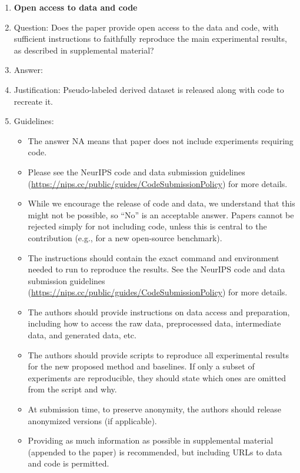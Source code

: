 \documentclass{article}
\begin{document}
\begin{enumerate}
\item {\bf Open access to data and code}
    \item[] Question: Does the paper provide open access to the data and code, with sufficient instructions to faithfully reproduce the main experimental results, as described in supplemental material?
    \item[] Answer: \answerYes{} %
    \item[] Justification: Pseudo-labeled derived dataset is released along with code to recreate it. 
    \item[] Guidelines:
    \begin{itemize}
        \item The answer NA means that paper does not include experiments requiring code.
        \item Please see the NeurIPS code and data submission guidelines (\url{https://nips.cc/public/guides/CodeSubmissionPolicy}) for more details.
        \item While we encourage the release of code and data, we understand that this might not be possible, so “No” is an acceptable answer. Papers cannot be rejected simply for not including code, unless this is central to the contribution (e.g., for a new open-source benchmark).
        \item The instructions should contain the exact command and environment needed to run to reproduce the results. See the NeurIPS code and data submission guidelines (\url{https://nips.cc/public/guides/CodeSubmissionPolicy}) for more details.
        \item The authors should provide instructions on data access and preparation, including how to access the raw data, preprocessed data, intermediate data, and generated data, etc.
        \item The authors should provide scripts to reproduce all experimental results for the new proposed method and baselines. If only a subset of experiments are reproducible, they should state which ones are omitted from the script and why.
        \item At submission time, to preserve anonymity, the authors should release anonymized versions (if applicable).
        \item Providing as much information as possible in supplemental material (appended to the paper) is recommended, but including URLs to data and code is permitted.
    \end{itemize}



\end{enumerate}
\end{document}
